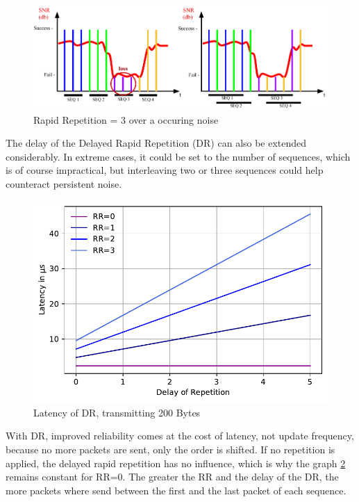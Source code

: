\begin{figure}[h]
	\centering
	\includegraphics[scale=0.75]{figures/BadChannel.pdf}
	\caption{Rapid Repetition = 3 over a occuring noise}
	\label{fig:badChannel}
\end{figure}

The delay of the Delayed Rapid Repetition (DR) can also be extended considerably.
In extreme cases, it could be set to the number of sequences, which is of course impractical,
but interleaving two or three sequences could help counteract persistent noise.

\begin{figure}[h]
	\centering
	\includegraphics[scale=0.60]{../Plot2/Graphs/bc_dr.pdf}
	\caption{Latency of DR, transmitting 200 Bytes}
	\label{fig:dr_delay}
\end{figure}

With DR, improved reliability comes at the cost of latency, not update frequency,
because no more packets are sent, only the order is shifted.
If no repetition is applied, the delayed rapid repetition has no influence,
which is why the graph \cref{fig:dr_delay} remains constant for RR=0.
The greater the RR and the delay of the DR, the more packets where send
between the first and the last packet of each sequence.

